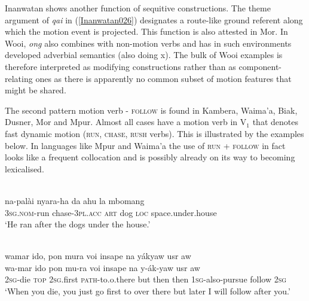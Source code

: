 Inanwatan shows another function of sequitive constructions. The theme argument of \textit{qai} in (\ref{Inanwatan026}) designates a route-like ground referent along which the motion event is projected. This function is also attested in Mor. In Wooi, \textit{ong} also combines with non-motion verbs and has in such environments developed adverbial semantics (also doing x). The bulk of Wooi examples is therefore interpreted as modifying constructions rather than as component-relating ones as there is apparently no common subset of motion features that might be shared.

The second pattern motion verb - \textsc{follow} is found in Kambera, Waima'a, Biak, Dusner, Mor and Mpur. Almost all cases have a motion verb in V$_{1}$ that denotes fast dynamic motion (\textsc{run}, \textsc{chase}, \textsc{rush} verbs). This is illustrated by the examples below. In languages like Mpur and Waima'a the use of \textsc{run} + \textsc{follow} in fact looks like a frequent collocation and is possibly already on its way to becoming lexicalised.

\ea \label{Kambera003}
\\
\gll na-palài nyara-ha da ahu la mbomang \\
\textsc{3}\textsc{sg}.\textsc{nom}-run chase-\textsc{3}\textsc{pl}.\textsc{acc} \textsc{art} dog \textsc{loc} space.under.house \\
\glft `He ran after the dogs under the house.' \\ 
\z

\ea \label{Biak005}
\\
\glll wamar ido, pon mura voi insape na yákyaw usr aw \\
wa-mar ido pon mu-ra voi insape na y-ák-yaw usr aw \\
\textsc{2}\textsc{sg}-die \textsc{top} \textsc{2}\textsc{sg}.first \textsc{path}-to.o.there but then then \textsc{1}\textsc{sg}-also-pursue follow \textsc{2}\textsc{sg} \\
\glft `When you die, you just go first to over there but later I will follow after you.'\\ 
\z

